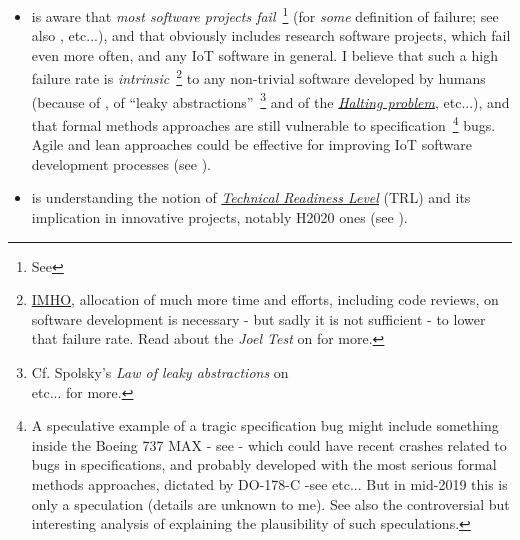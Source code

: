 \begin{itemize}
    \item is aware that \emph{most software projects
    fail}~\footnote{See
    }
      (for \emph{some} definition of failure; see also
      \cite{Brooks:1995:MM, Khan:2016-GSEPIM,
        Attarzadeh:2008:proj-man}, etc...), and that obviously
      includes research software projects, which fail even more often,
      and any IoT software in general. I believe that such a high
      failure rate is
      \emph{intrinsic}~\footnote{\href{https://en.wiktionary.org/wiki/IMHO}{IMHO},
      allocation of much more time and efforts, including code
      reviews, on software development is necessary - but sadly it is
      not sufficient - to lower that failure rate. Read about the
      \emph{Joel Test} on
      for more.}  to any non-trivial software developed by humans
      (because of \cite{Braun:1956:magical-seven}, of ``leaky
      abstractions''~\footnote{Cf. Spolsky's \emph{Law of leaky
      abstractions}  on
      \\ 
      etc... for more.}  and of the
      \href{https://en.wikipedia.org/wiki/Halting\_problem}{\emph{Halting
        problem}}, etc...), and that formal methods approaches are
      still vulnerable   to
      specification~\footnote{A speculative example of a tragic
      specification bug might include something inside the Boeing 737
      MAX - see 
      - which could have recent crashes related to bugs in
      specifications, and probably developed with the most serious
      formal methods approaches, dictated by DO-178-C -see
       etc... But in
      mid-2019 this is only a speculation (details are unknown to
      me). See also the controversial but interesting analysis of
      \cite{graeber:2018:bullshit} explaining the plausibility of such
      speculations.}  bugs. Agile and lean approaches could be
      effective for improving IoT software development processes (see
      \cite{Rodriguez:2019:AgileLean}).
      

    \item is understanding the notion of
      \href{https://en.wikipedia.org/wiki/Technology\_readiness\_level}{\emph
        {Technical Readiness Level}}  (TRL) and its
      implication in innovative projects, notably H2020  ones (see
      \cite{Heder:2017:TRL}).
      
\end{itemize}


